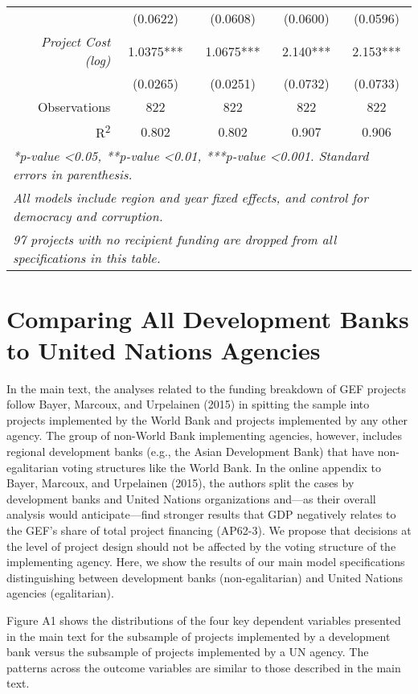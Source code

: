 \documentclass{article}
\begin{document}
\begin{singlespace}
\begin{table}[H]
{\begin{tabular}{rcccc}
				\textit{} & (0.0622) & (0.0608) & (0.0600) & (0.0596) \\
				\textit{Project Cost (log)} & 1.0375*** & 1.0675*** & 2.140*** & 2.153*** \\
				\textit{} & (0.0265) & (0.0251) & (0.0732) & (0.0733) \\ \hline
				Observations & 822 & 822 & 822 & 822 \\
				R\textsuperscript{2} & 0.802 & 0.802 & 0.907 & 0.906 \\ \hline
				\multicolumn{5}{l}{\textit{*p-value \textless 0.05, **p-value \textless 0.01, ***p-value \textless 0.001.  Standard errors in parenthesis.}} \\
				\multicolumn{5}{l}{\textit{All models include region and year fixed effects, and control for democracy and corruption.}} \\
				\multicolumn{5}{l}{\textit{97 projects with no recipient funding are dropped from all specifications in this table.}}
			\end{tabular}%
		}
	\end{table}
\end{singlespace}    				

\section{Comparing All Development Banks to United Nations Agencies}
In the main text, the analyses related to the funding breakdown of GEF projects follow Bayer, Marcoux, and Urpelainen (2015) in spitting the sample into projects implemented by the World Bank and projects implemented by any other agency.  The group of non-World Bank implementing agencies, however, includes regional development banks (e.g., the Asian Development Bank) that have non-egalitarian voting structures like the World Bank.  In the online appendix to Bayer, Marcoux, and Urpelainen (2015), the authors split the cases by development banks and United Nations organizations and---as their overall analysis would anticipate---find stronger results that GDP negatively relates to the GEF’s share of total project financing (AP62-3).  We propose that decisions at the level of project design should not be affected by the voting structure of the implementing agency.  Here, we show the results of our main model specifications distinguishing between development banks (non-egalitarian) and United Nations agencies (egalitarian). 

Figure A1 shows the distributions of the four key dependent variables presented in the main text for the subsample of projects implemented by a development bank versus the subsample of projects implemented by a UN agency.  The patterns across the outcome variables are similar to those described in the main text.
\end{document}
